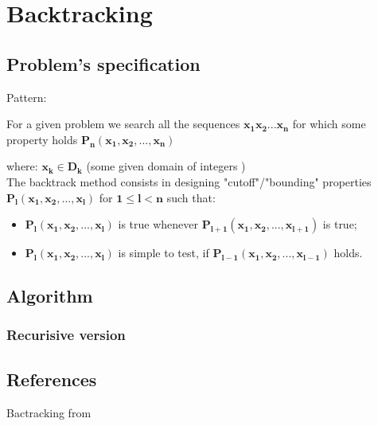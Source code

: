 \chapter{Backtracking}
\section{Problem's specification}

Pattern:

For a given problem we search all the sequences  $\bm{x_{1}x_{2} ... x_{n}}$ for which some property holds
 $\bm{P_n(x_{1},x_{2}, ..., x_{n})}$

\bigskip where: $\bm{x_k \in D_k}$ (some given domain of integers )
\\
The backtrack method consists in designing "cutoff"/"bounding" properties $\bm{P_l(x_{1},x_{2}, ..., x_{l})}$ for $\bm{1\leq l < n}$ such that: 

\begin{itemize}
 \item $\bm{P_l(x_{1},x_{2}, ..., x_{l})}$ is true whenever $\bm{P_{l+1}(x_{1},x_{2}, ..., x_{l+1})}$ is true;
 \item $\bm{P_l(x_{1},x_{2}, ..., x_{l})}$ is simple to test, if $\bm{P_{l-1}(x_{1},x_{2}, ..., x_{l-1})}$ holds.
 
\end{itemize}

\section{Algorithm}
\subsection{Recurisive version}
\SetAlgoLongEnd
\begin{algorithm}
\end{algorithm}


\section{References}

Bactracking from \cite{KnuthArtOfCompProg4-5b}
